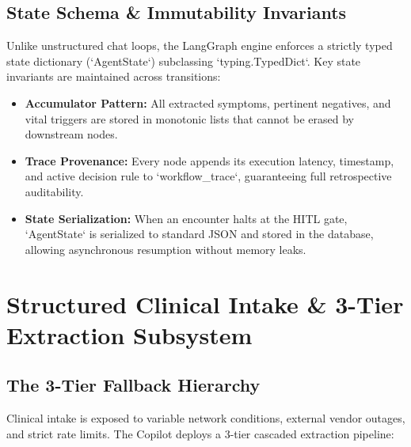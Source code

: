 \documentclass[11pt,a4paper]{article}
\begin{document}
\subsection{State Schema \& Immutability Invariants}
Unlike unstructured chat loops, the LangGraph engine enforces a strictly typed state dictionary (`AgentState`) subclassing `typing.TypedDict`. Key state invariants are maintained across transitions:
\begin{itemize}[leftmargin=1.5em]
    \item \textbf{Accumulator Pattern:} All extracted symptoms, pertinent negatives, and vital triggers are stored in monotonic lists that cannot be erased by downstream nodes.
    \item \textbf{Trace Provenance:} Every node appends its execution latency, timestamp, and active decision rule to `workflow_trace`, guaranteeing full retrospective auditability.
    \item \textbf{State Serialization:} When an encounter halts at the HITL gate, `AgentState` is serialized to standard JSON and stored in the database, allowing asynchronous resumption without memory leaks.
\end{itemize}

\section{Structured Clinical Intake \& 3-Tier Extraction Subsystem}

\subsection{The 3-Tier Fallback Hierarchy}
Clinical intake is exposed to variable network conditions, external vendor outages, and strict rate limits. The Copilot deploys a 3-tier cascaded extraction pipeline:
\end{document}
